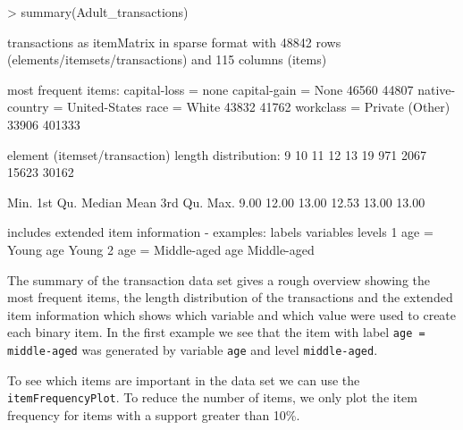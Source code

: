 \documentclass[10pt,a4paper]{article}
\newcommand{\code}[1]{\texttt{#1}}
\begin{document}
\begin{Schunk}
\begin{Sinput}
> summary(Adult_transactions)
\end{Sinput}
\begin{Soutput}
transactions as itemMatrix in sparse format with
 48842 rows (elements/itemsets/transactions) and
 115 columns (items)

most frequent items:
           capital-loss = none            capital-gain = None 
                         46560                          44807 
native-country = United-States                   race = White 
                         43832                          41762 
           workclass = Private                        (Other) 
                         33906                         401333 

element (itemset/transaction) length distribution:
    9    10    11    12    13 
   19   971  2067 15623 30162 

   Min. 1st Qu.  Median    Mean 3rd Qu.    Max. 
   9.00   12.00   13.00   12.53   13.00   13.00 

includes extended item information - examples:
             labels variables      levels
1       age = Young       age       Young
2 age = Middle-aged       age Middle-aged
\end{Soutput}
\end{Schunk}

The summary of the transaction data set gives a rough overview showing
the most frequent items, the length distribution of the transactions and
the extended item information which shows which variable and which value
were used to create each binary item. In the first example we see that
the item with label \texttt{age = middle-aged} was generated by variable
\texttt{age} and level \texttt{middle-aged}.  

To see which items are important in the data set we can use the 
\code{itemFrequencyPlot}. To reduce the number of items, we only plot
the item frequency for items with a support greater than 10\%.
\end{document}
